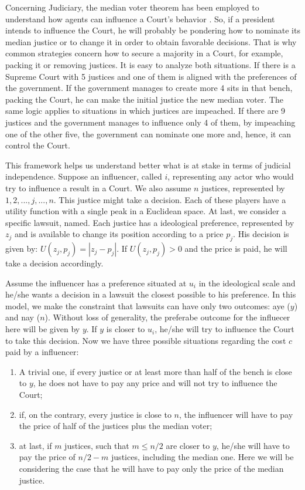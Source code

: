 \documentclass[12pt, a4paper]{article}
\begin{document}
Concerning Judiciary, the median voter theorem has been employed to 
understand how agents can influence a Court's 
behavior \citep{martin2004median}. So, if a president  
intends to influence the Court, he will probably be 
pondering how to nominate its median justice or to 
change it in order to obtain favorable decisions. 
That is why common strategies concern how to secure a 
majority in a Court, for example, packing it or 
removing justices. It is easy to analyze both situations. 
If there is a Supreme Court with 5 justices and one of 
them is aligned with the preferences of the government. 
If the government manages to create more 4 sits in that 
bench, packing the Court, he can make the initial 
justice the new median voter. The same logic applies 
to situations in which justices are impeached. 
If there are 9 justices and the government manages 
to influence only 4 of them, by impeaching 
one of the other five, the government can 
nominate one more and, hence, it can control the Court.

This framework helps us understand better what is at stake
in terms of judicial independence.
Suppose an influencer, called $i$, representing any actor
who would try to influence a result in a Court. 
We also assume $n$ justices, represented by $1, 2, ..., j, ...,  n$. 
This justice might take a decision. Each of these players 
have a utility function with a single peak in a Euclidean space.  
At last, we consider a specific lawsuit, named.
Each justice has a ideological preference, represented by $z_j$ and 
is available to change its position according to 
a price $p_j$. His decision is given by: $U(z_j, p_j) = |z_j - p_j|$.
If $U(z_j, p_j) > 0$ and the price is paid, he will take a decision
accordingly.

Assume the influencer has a preference situated 
at $u_i$ in the ideological scale and he/she wants a decision
in a lawsuit the closest possible to his preference.
In this model, we make the constraint that lawsuits can have
only two outcomes: aye ($y$) and nay ($n$). Without loss of
generality, the preferabe outcome for the influecer here will
be given by $y$. If $y$ is closer to $u_i$,
he/she will try to influence the Court to take this decision.
Now we have three possible situations regarding the cost $c$ paid
by a influencer: 
\begin{enumerate}
	\item A trivial one, 
if every justice or at least more than half of the bench 
is close to  $y$, he does not have to pay 
any price and will not try to influence the Court;
     \item if, on the contrary, every justice is close to $n$, 
the influencer will have to pay the price of half of the justices
plus the median voter;  
     \item at last, if $m$ justices, such that $m \leq n/2$ are closer to $y$,
he/she will have to pay the price of $n/2 - m$ justices, including the
median one. Here we will be considering the case that he will have to pay
only the price of the median justice.
\end{enumerate}
\end{document}

